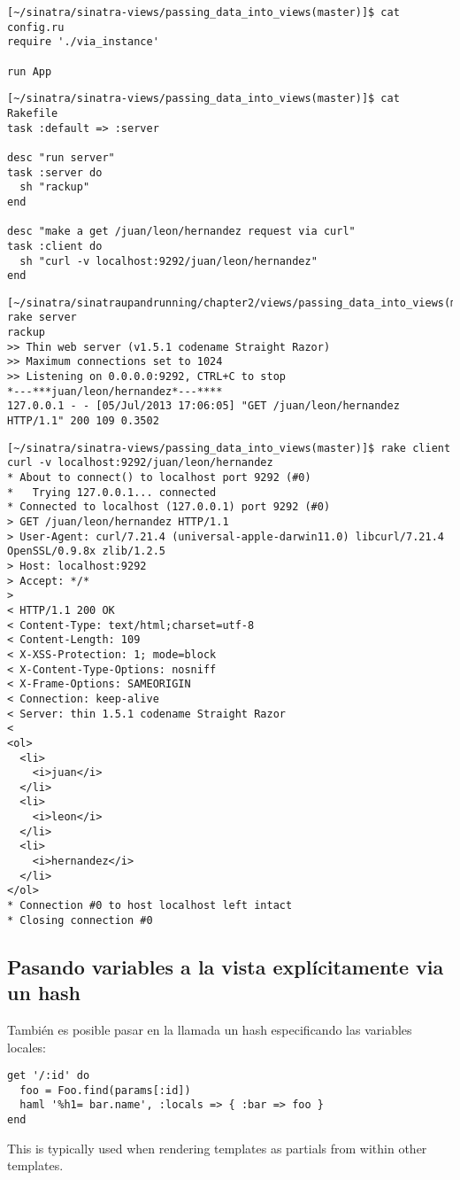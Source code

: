 \begin{verbatim}
[~/sinatra/sinatra-views/passing_data_into_views(master)]$ cat config.ru 
require './via_instance'

run App
\end{verbatim}

\begin{verbatim}
[~/sinatra/sinatra-views/passing_data_into_views(master)]$ cat Rakefile 
task :default => :server

desc "run server"
task :server do
  sh "rackup"
end

desc "make a get /juan/leon/hernandez request via curl"
task :client do
  sh "curl -v localhost:9292/juan/leon/hernandez"
end
\end{verbatim}

\begin{verbatim}
[~/sinatra/sinatraupandrunning/chapter2/views/passing_data_into_views(master)]$ rake server
rackup
>> Thin web server (v1.5.1 codename Straight Razor)
>> Maximum connections set to 1024
>> Listening on 0.0.0.0:9292, CTRL+C to stop
*---***juan/leon/hernandez*---****
127.0.0.1 - - [05/Jul/2013 17:06:05] "GET /juan/leon/hernandez HTTP/1.1" 200 109 0.3502
\end{verbatim}

\begin{verbatim}
[~/sinatra/sinatra-views/passing_data_into_views(master)]$ rake client
curl -v localhost:9292/juan/leon/hernandez
* About to connect() to localhost port 9292 (#0)
*   Trying 127.0.0.1... connected
* Connected to localhost (127.0.0.1) port 9292 (#0)
> GET /juan/leon/hernandez HTTP/1.1
> User-Agent: curl/7.21.4 (universal-apple-darwin11.0) libcurl/7.21.4 OpenSSL/0.9.8x zlib/1.2.5
> Host: localhost:9292
> Accept: */*
> 
< HTTP/1.1 200 OK
< Content-Type: text/html;charset=utf-8
< Content-Length: 109
< X-XSS-Protection: 1; mode=block
< X-Content-Type-Options: nosniff
< X-Frame-Options: SAMEORIGIN
< Connection: keep-alive
< Server: thin 1.5.1 codename Straight Razor
< 
<ol>
  <li>
    <i>juan</i>
  </li>
  <li>
    <i>leon</i>
  </li>
  <li>
    <i>hernandez</i>
  </li>
</ol>
* Connection #0 to host localhost left intact
* Closing connection #0
\end{verbatim}

\subsection{Pasando variables a la vista explícitamente via un hash}

También es posible pasar en la llamada un hash especificando 
las variables locales:
\begin{verbatim}
get '/:id' do
  foo = Foo.find(params[:id])
  haml '%h1= bar.name', :locals => { :bar => foo }
end
\end{verbatim}
This is typically used when rendering templates as partials from within other templates.

